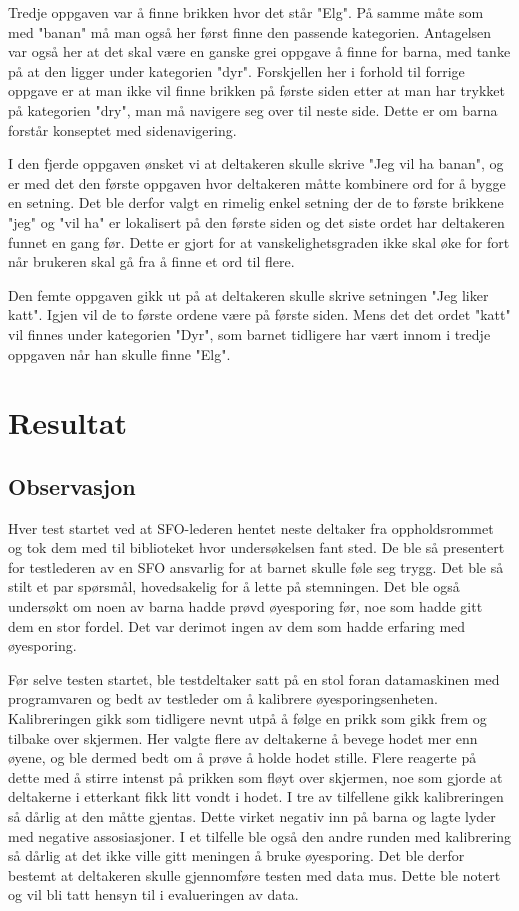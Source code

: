 Tredje oppgaven var å finne brikken hvor det står "Elg". På samme måte som med "banan" må man også her først finne den passende kategorien. Antagelsen var også her at det skal være en ganske grei oppgave å finne for barna, med tanke på at den ligger under kategorien "dyr". Forskjellen her i forhold til forrige oppgave er at man ikke vil finne brikken på første siden etter at man har trykket på kategorien "dry", man må navigere seg over til neste side. Dette er om barna forstår konseptet med sidenavigering.
 
I den fjerde oppgaven ønsket vi at deltakeren skulle skrive "Jeg vil ha banan", og er med det den første oppgaven hvor deltakeren måtte kombinere ord for å bygge en setning. Det ble derfor valgt en rimelig enkel setning der de to første brikkene "jeg" og "vil ha" er lokalisert på den første siden og det siste ordet har deltakeren funnet en gang før. Dette er gjort for at vanskelighetsgraden ikke skal øke for fort når brukeren skal gå fra å finne et ord til flere.
 
Den femte oppgaven gikk ut på at deltakeren skulle skrive setningen "Jeg liker katt". Igjen vil de to første ordene være på første siden. Mens det det ordet "katt" vil finnes under kategorien "Dyr", som barnet tidligere har vært innom i tredje oppgaven når han skulle finne "Elg". 
 
 
\section{Resultat} 
 
\subsection{Observasjon} 
 
Hver test startet ved at SFO-lederen hentet neste deltaker fra oppholdsrommet og tok dem med til biblioteket hvor undersøkelsen fant sted. De ble så presentert for testlederen av en SFO ansvarlig for at barnet skulle føle seg trygg. Det ble så stilt et par spørsmål, hovedsakelig for å lette på stemningen. Det ble også undersøkt om noen av barna hadde prøvd øyesporing før, noe som hadde gitt dem en stor fordel. Det var derimot ingen av dem som hadde erfaring med øyesporing. 
 
 
Før selve testen startet, ble testdeltaker satt på en stol foran datamaskinen med programvaren og bedt av testleder om å kalibrere øyesporingsenheten. Kalibreringen gikk som tidligere nevnt utpå å følge en prikk som gikk frem og tilbake over skjermen. Her valgte flere av deltakerne å bevege hodet mer enn øyene, og ble dermed bedt om å prøve å holde hodet stille. Flere reagerte på dette med å stirre intenst på prikken som fløyt over skjermen, noe som gjorde at deltakerne i etterkant fikk litt vondt i hodet. I tre av tilfellene gikk kalibreringen så dårlig at den måtte gjentas. Dette virket negativ inn på barna og lagte lyder med negative assosiasjoner. I et tilfelle ble også den andre runden med kalibrering så dårlig at det ikke ville gitt meningen å bruke øyesporing. Det ble derfor bestemt at deltakeren skulle gjennomføre testen med data mus. Dette ble notert og vil bli tatt hensyn til i evalueringen av data. 
 
